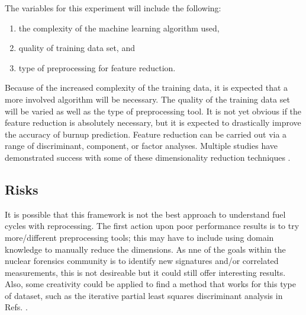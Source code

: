 The variables for this experiment will include the following:
\begin{enumerate}
  \itemsep-0.75em
  \item the complexity of the machine learning algorithm used,
  \item quality of training data set, and 
  \item type of preprocessing for feature reduction.
\end{enumerate}
Because of the increased complexity of the training data, it is expected that a
more involved algorithm will be necessary.  The quality of the training data
set will be varied as well as the type of preprocessing tool.  It is not yet
obvious if the feature reduction is absolutely necessary, but it is expected to
drastically improve the accuracy of burnup prediction.  Feature reduction can
be carried out via a range of discriminant, component, or factor analyses.
Multiple studies have demonstrated success with some of these dimensionality
reduction techniques \cite{nicolaou_2006, nicolaou_2009, nicolaou_2014,
robel_2009, pu_discrimination, jones_viz_2014, jones_snf_2014}.   

\subsection*{Risks}

It is possible that this framework is not the best approach to understand fuel
cycles with reprocessing. The first action upon poor performance results is to
try more/different preprocessing tools; this may have to include using domain
knowledge to manually reduce the dimensions. As nne of the goals within the
nuclear forensics community is to identify new signatures and/or correlated
measurements, this is not desireable but it could still offer interesting
results. Also, some creativity could be applied to find a method that works for
this type of dataset, such as the iterative partial least squares discriminant
analysis in Refs. \cite{robel_2009, pu_discrimination}.
